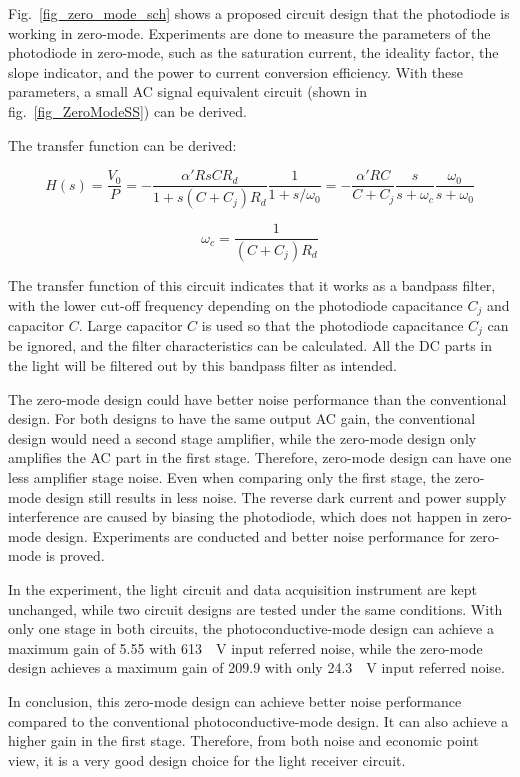 Fig.~\ref{fig_zero_mode_sch} shows a proposed circuit design that the photodiode is working in zero-mode.  Experiments are done to measure the parameters of the photodiode in zero-mode, such as the saturation current, the ideality factor, the slope indicator, and the power to current conversion efficiency.  With these parameters, a small AC signal equivalent circuit (shown in fig.~\ref{fig_ZeroModeSS}) can be derived.  

The transfer function can be derived:

$$H(s) = \frac{V_0}{P} = - \frac{\alpha'RsCR_d}{1+s(C+C_j)R_d}\frac{1}{1+s/\omega_0} = - \frac{\alpha'RC}{C+C_j} \frac{s}{s+\omega_c} \frac{\omega_0}{s+\omega_0}$$

$$\omega_c = \frac{1}{(C+C_j)R_d}$$


The transfer function of this circuit indicates that it works as a bandpass filter, with the lower cut-off frequency depending on the photodiode capacitance $C_j$ and capacitor $C$.  Large capacitor $C$ is used so that the photodiode capacitance $C_j$ can be ignored, and the filter characteristics can be calculated.  All the DC parts in the light will be filtered out by this bandpass filter as intended.

The zero-mode design could have better noise performance than the conventional design.  For both designs to have the same output AC gain, the conventional design would need a second stage amplifier, while the zero-mode design only amplifies the AC part in the first stage.  Therefore, zero-mode design can have one less amplifier stage noise.  Even when comparing only the first stage, the zero-mode design still results in less noise.  The reverse dark current and power supply interference are caused by biasing the photodiode, which does not happen in zero-mode design.  Experiments are conducted and better noise performance for zero-mode is proved.

In the experiment, the light circuit and data acquisition instrument are kept unchanged, while two circuit designs are tested under the same conditions.  With only one stage in both circuits, the photoconductive-mode design can achieve a maximum gain of 5.55 with \qty{613}{\mu V} input referred noise, while the zero-mode design achieves a maximum gain of 209.9 with only \qty{24.3}{\mu V} input referred noise.

In conclusion, this zero-mode design can achieve better noise performance compared to the conventional photoconductive-mode design.  It can also achieve a higher gain in the first stage.  Therefore, from both noise and economic point view, it is a very good design choice for the light receiver circuit.

